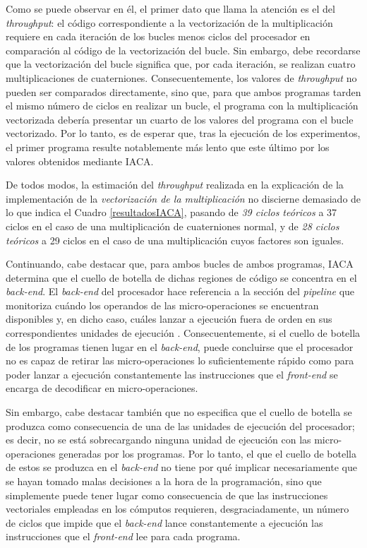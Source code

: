 \documentclass[conference]{IEEEtran}
\begin{document}
Como se puede observar en él, el primer dato que llama la atención es el del \textit{throughput}: el código correspondiente a la vectorización de la multiplicación requiere en cada iteración de los bucles menos ciclos del procesador en comparación al código de la vectorización del bucle. Sin embargo, debe recordarse que la vectorización del bucle significa que, por cada iteración, se realizan cuatro multiplicaciones de cuaterniones. Consecuentemente, los valores de \textit{throughput} no pueden ser comparados directamente, sino que, para que ambos programas tarden el mismo número de ciclos en realizar un bucle, el programa con la multiplicación vectorizada debería presentar un cuarto de los valores del programa con el bucle vectorizado. Por lo tanto, es de esperar que, tras la ejecución de los experimentos, el primer programa resulte notablemente más lento que este último por los valores obtenidos mediante IACA.

De todos modos, la estimación del \textit{throughput} realizada en la explicación de la implementación de la \textit{vectorización de la multiplicación} no discierne demasiado de lo que indica el Cuadro \ref{resultadosIACA}, pasando de \textit{39 ciclos teóricos} a 37 ciclos en el caso de una multiplicación de cuaterniones normal, y de \textit{28 ciclos teóricos} a 29 ciclos en el caso de una multiplicación cuyos factores son iguales.

Continuando, cabe destacar que, para ambos bucles de ambos programas, IACA determina que el cuello de botella de dichas regiones de código se concentra en el \textit{back-end}. El \textit{back-end} del procesador hace referencia a la sección del \textit{pipeline} que monitoriza cuándo los operandos de las micro-operaciones se encuentran disponibles y, en dicho caso, cuáles lanzar a ejecución fuera de orden en sus correspondientes unidades de ejecución \cite{queEsBackEnd}. Consecuentemente, si el cuello de botella de los programas tienen lugar en el \textit{back-end}, puede concluirse que el procesador no es capaz de retirar las micro-operaciones lo suficientemente rápido como para poder lanzar a ejecución constantemente las instrucciones que el \textit{front-end} se encarga de decodificar en micro-operaciones.

Sin embargo, cabe destacar también que no especifica que el cuello de botella se produzca como consecuencia de una de las unidades de ejecución del procesador; es decir, no se está sobrecargando ninguna unidad de ejecución con las micro-operaciones generadas por los programas. Por lo tanto, el que el cuello de botella de estos se produzca en el \textit{back-end} no tiene por qué implicar necesariamente que se hayan tomado malas decisiones a la hora de la programación, sino que simplemente puede tener lugar como consecuencia de que las instrucciones vectoriales empleadas en los cómputos requieren, desgraciadamente, un número de ciclos que impide que el \textit{back-end} lance constantemente a ejecución las instrucciones que el \textit{front-end} lee para cada programa.
\end{document}
